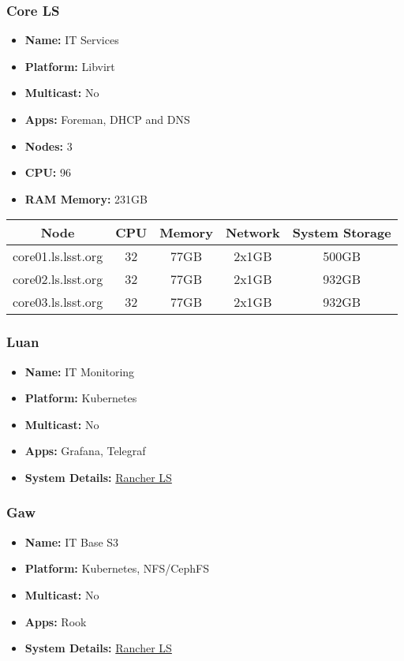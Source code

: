 \subsubsection{Core LS}
\begin{itemize}
  \itemsep0em 
  \item \textbf{Name:}      IT Services
  \item \textbf{Platform:}  Libvirt
  \item \textbf{Multicast:}  No
  \item \textbf{Apps:}       Foreman, DHCP and DNS
  \item \textbf{Nodes:}      3
  \item \textbf{CPU:}        96
  \item \textbf{RAM Memory:} 231GB
\end{itemize}
\begin{center}
  \small
  \begin{tabular}{||c c c c c||} 
    \hline
    \textbf{Node} & \textbf{CPU} & \textbf{Memory} & \textbf{Network} & \textbf{System Storage} \\ [0.5ex]
    \hline
    core01.ls.lsst.org & 32 & 77GB & 2x1GB & 500GB \\
    \hline
    core02.ls.lsst.org & 32 & 77GB & 2x1GB & 932GB \\
    \hline
    core03.ls.lsst.org & 32 & 77GB & 2x1GB & 932GB \\
    \hline
  \end{tabular}
\end{center}

\subsubsection{Luan}
\begin{itemize}
  \itemsep0em 
  \item \textbf{Name:}       IT Monitoring
  \item \textbf{Platform:}   Kubernetes
  \item \textbf{Multicast:}  No
  \item \textbf{Apps:}       Grafana, Telegraf
  \item \textbf{System Details:} \href{https://rancher.ls.lsst.org}{Rancher LS}

\end{itemize}

\subsubsection{Gaw}
\begin{itemize}
  \itemsep0em 
  \item \textbf{Name:}       IT Base S3
  \item \textbf{Platform:}   Kubernetes, NFS/CephFS
  \item \textbf{Multicast:}  No
  \item \textbf{Apps:}       Rook
  \item \textbf{System Details:} \href{https://rancher.ls.lsst.org}{Rancher LS}

\end{itemize}

